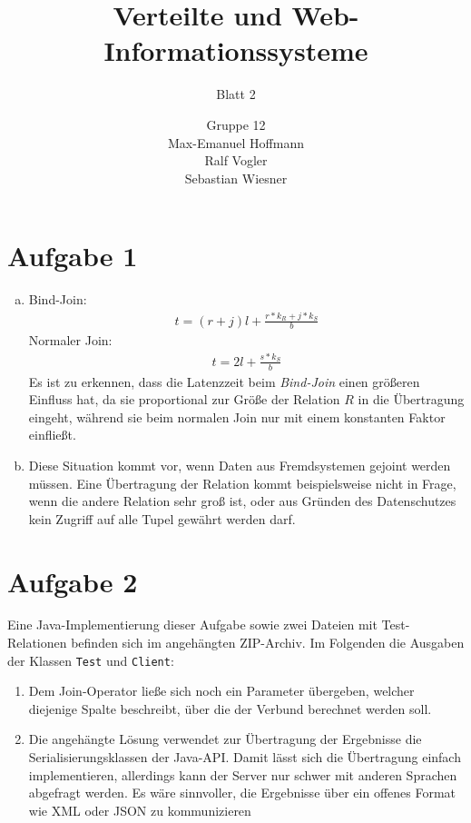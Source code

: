 \documentclass[11pt,a4paper]{scrartcl}
\begin{document}
\author{Gruppe 12\\Max-Emanuel Hoffmann\\Ralf Vogler\\Sebastian Wiesner}
\title{Verteilte und Web-Informationssysteme}
\subtitle{Blatt 2}

\maketitle

\section*{Aufgabe 1}

\begin{enumerate}[a)]
\item Bind-Join:
\begin{align*}
t = (r + j)l + \frac{r*k_R + j*k_S}{b}
\end{align*}
Normaler Join:
\begin{align*}
t = 2l + \frac{s*k_S}{b}
\end{align*}
Es ist zu erkennen, dass die Latenzzeit beim \emph{Bind-Join} einen größeren
Einfluss hat, da sie proportional zur Größe der Relation $R$ in die Übertragung
eingeht, während sie beim normalen Join nur mit einem konstanten Faktor
einfließt.
\item Diese Situation kommt vor, wenn Daten aus Fremdsystemen gejoint werden
  müssen.  Eine Übertragung der Relation kommt beispielsweise nicht in Frage,
  wenn die andere Relation sehr groß ist, oder aus Gründen des Datenschutzes
  kein Zugriff auf alle Tupel gewährt werden darf.
\end{enumerate}

\section*{Aufgabe 2}

Eine Java-Implementierung dieser Aufgabe sowie zwei Dateien mit Test-Relationen
befinden sich im angehängten ZIP-Archiv.  Im Folgenden die Ausgaben der Klassen
\texttt{Test} und \texttt{Client}:

\begin{enumerate}
\item Dem Join-Operator ließe sich noch ein Parameter übergeben, welcher
  diejenige Spalte beschreibt, über die der Verbund berechnet werden soll.
\item Die angehängte Lösung verwendet zur Übertragung der Ergebnisse die
  Serialisierungsklassen der Java-API.  Damit lässt sich die Übertragung
  einfach implementieren, allerdings kann der Server nur schwer mit anderen
  Sprachen abgefragt werden.  Es wäre sinnvoller, die Ergebnisse über ein
  offenes Format wie XML oder JSON zu kommunizieren
\end{enumerate}
\end{document}
